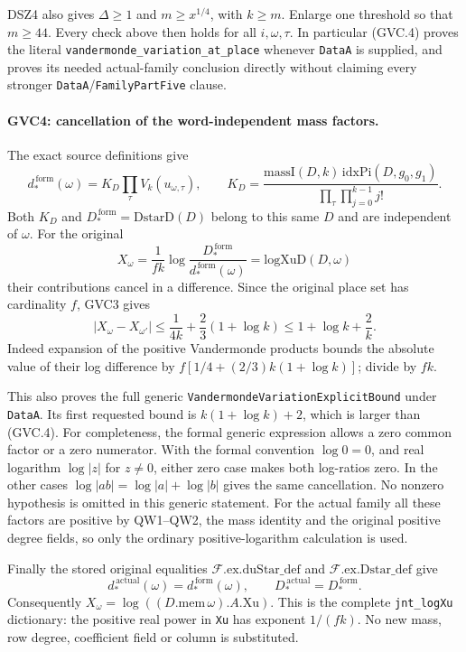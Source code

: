 DSZ4 also gives $\Delta\ge1$ and $m\ge x^{1/4}$,
with $k\ge m$. Enlarge one threshold so that $m\ge44$.
Every check above then holds for all $i,\omega,\tau$.
In particular (GVC.4) proves the literal
\texttt{vandermonde\_variation\_at\_place} whenever
\texttt{DataA} is supplied, and proves its needed actual-family
conclusion directly without claiming every stronger
\texttt{DataA}/\texttt{FamilyPartFive} clause.

\paragraph{GVC4: cancellation of the word-independent mass factors.}
\label{claim:GVC4}
The exact source definitions give
\[
 d_*^{\,\mathrm{form}}(\omega)
 =K_D\prod_{\tau}V_k(u_{\omega,\tau}),\qquad
 K_D=\frac{\mathrm{massI}(D,k)\,
          \mathrm{idxPi}(D,g_0,g_1)}
          {\prod_{\tau}\prod_{j=0}^{k-1}j!}.                 \tag{GVC.6}
\]
Both $K_D$ and $D_*^{\,\mathrm{form}}=\mathrm{DstarD}(D)$
belong to this same $D$ and are independent of $\omega$.
For the original
\[
 X_\omega=\frac1{fk}
          \log\frac{D_*^{\,\mathrm{form}}}
                    {d_*^{\,\mathrm{form}}(\omega)}
            =\mathrm{logXuD}(D,\omega)
\]
their contributions cancel in a difference. Since the original
place set has cardinality $f$, GVC3 gives
\[
 \boxed{\quad
 |X_\omega-X_{\omega'}|
 \le \frac1{4k}+\frac23(1+\log k)
 \le 1+\log k+\frac2k .
 \quad}                                                      \tag{GVC.7}
\]
Indeed expansion of the positive Vandermonde products bounds the
absolute value of their log difference by
$f[1/4+(2/3)k(1+\log k)]$; divide by $fk$.

This also proves the full generic
\texttt{VandermondeVariationExplicitBound} under \texttt{DataA}.
Its first requested bound is
$k(1+\log k)+2$, which is larger than (GVC.4).
For completeness, the formal generic expression allows a zero
common factor or a zero numerator. With the formal convention
$\log0=0$, and real logarithm $\log|z|$ for $z\ne0$, either zero
case makes both log-ratios zero. In the other cases
$\log|ab|=\log|a|+\log|b|$ gives the same cancellation.
No nonzero hypothesis is omitted in this generic statement.
For the actual family all these factors are positive by
QW1--QW2, the mass identity and the original positive degree fields,
so only the ordinary positive-logarithm calculation is used.

Finally the stored original equalities
$\mathcal F.\mathrm{ex}.\mathrm{duStar\_def}$ and
$\mathcal F.\mathrm{ex}.\mathrm{Dstar\_def}$ give
\[
 d_*^{\,\mathrm{actual}}(\omega)=d_*^{\,\mathrm{form}}(\omega),
 \qquad D_*^{\,\mathrm{actual}}=D_*^{\,\mathrm{form}}.
\]
Consequently $X_\omega=\log((D.\mathrm{mem}\,\omega).A.\mathrm{Xu})$.
This is the complete \texttt{jnt\_logXu} dictionary: the positive
real power in \texttt{Xu} has exponent $1/(fk)$.
No new mass, row degree, coefficient field or column is substituted.

